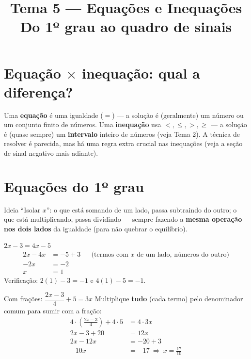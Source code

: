 \documentclass[12pt,a4paper]{article}
\title{\vspace{-1.5cm}\textbf{Tema 5 — Equações e Inequações}\\[2pt]\large Do 1º grau ao quadro de sinais}
\author{}
\date{}
\begin{document}
\maketitle
\thispagestyle{empty}

\section*{Equação $\times$ inequação: qual a diferença?}
Uma \textbf{equação} é uma igualdade ($=$) — a solução é (geralmente) um
número ou um conjunto finito de números. Uma \textbf{inequação} usa $<,\le,>,\ge$
— a solução é (quase sempre) um \textbf{intervalo} inteiro de números (veja
Tema 2). A técnica de resolver é parecida, mas há uma regra extra crucial
nas inequações (veja a seção de sinal negativo mais adiante).

\section{Equações do 1º grau}

\begin{definicao}{Ideia}
``Isolar $x$'': o que está somando de um lado, passa subtraindo do outro; o
que está multiplicando, passa dividindo — sempre fazendo a \textbf{mesma
operação nos dois lados} da igualdade (para não quebrar o equilíbrio).
\end{definicao}

\begin{exemplo}{$2x-3=4x-5$}
\begin{align*}
2x - 4x &= -5+3 &&\text{(termos com $x$ de um lado, números do outro)}\\
-2x &= -2\\
x &= 1
\end{align*}
Verificação: $2(1)-3 = -1$ e $4(1)-5=-1$. \checkmark
\end{exemplo}

\begin{exemplo}{Com frações: $\dfrac{2x-3}{4}+5=3x$}
Multiplique \textbf{tudo} (cada termo) pelo denominador comum para sumir com a fração:
\begin{align*}
4\cdot\left(\frac{2x-3}{4}\right) + 4\cdot5 &= 4\cdot3x\\
2x-3+20 &= 12x\\
2x-12x &= -20+3\\
-10x&=-17 \ \Rightarrow\ x=\frac{17}{10}
\end{align*}
\end{exemplo}
\end{document}
